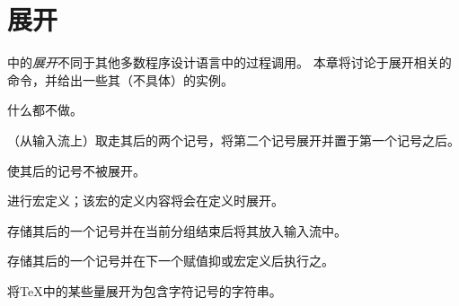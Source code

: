 \documentclass{book}
\begin{document}
\chapter{展开}\label{expand}

中的\emph{展开}不同于其他多数程序设计语言中的过程调用。
本章将讨论于展开相关的命令，并给出一些其（不具体）的实例。

\label{cschap:relax}\label{cschap:expandafter}\label{cschap:noexpand}\label{cschap:afterassignment}\label{cschap:the}
\begin{inventory}
\item [\cs{relax}] 
     什么都不做。


\item [\cs{expandafter}]  
      （从输入流上）取走其后的两个记号，将第二个记号展开并置于第一个记号之后。

\item [\cs{noexpand}]   
      使其后的记号不被展开。


\item [\cs{edef}] 
      进行宏定义；该宏的定义内容将会在定义时展开。
% 
 
\item [\cs{aftergroup}]  
      存储其后的一个记号并在当前分组结束后将其放入输入流中。

\item [\cs{afterassignment}]   
      存储其后的一个记号并在下一个赋值抑或宏定义后执行之。

\item [\cs{the}] 
      将{\TeX}中的某些量展开为包含字符记号的字符串。

\end{inventory}
\end{document}
